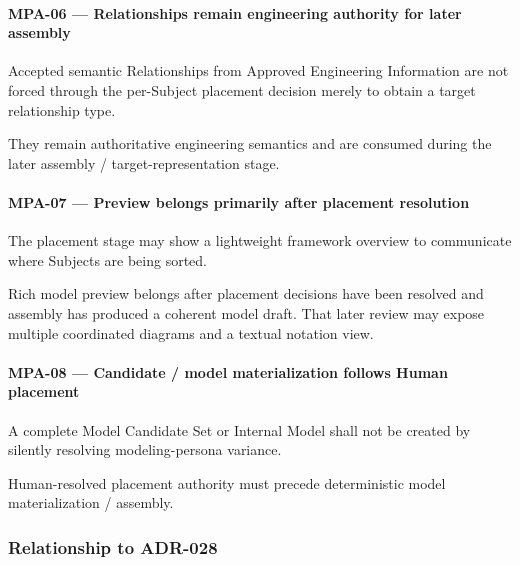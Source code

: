 \hypertarget{mpa-06--relationships-remain-engineering-authority-for-later-assembly}{%
\paragraph{MPA-06 --- Relationships remain engineering authority for later assembly}\label{mpa-06--relationships-remain-engineering-authority-for-later-assembly}}

Accepted semantic Relationships from Approved Engineering Information are not forced through the per-Subject placement decision merely to obtain a target relationship type.

They remain authoritative engineering semantics and are consumed during the later assembly / target-representation stage.

\hypertarget{mpa-07--preview-belongs-primarily-after-placement-resolution}{%
\paragraph{MPA-07 --- Preview belongs primarily after placement resolution}\label{mpa-07--preview-belongs-primarily-after-placement-resolution}}

The placement stage may show a lightweight framework overview to communicate where Subjects are being sorted.

Rich model preview belongs after placement decisions have been resolved and assembly has produced a coherent model draft. That later review may expose multiple coordinated diagrams and a textual notation view.

\hypertarget{mpa-08--candidate--model-materialization-follows-human-placement}{%
\paragraph{MPA-08 --- Candidate / model materialization follows Human placement}\label{mpa-08--candidate--model-materialization-follows-human-placement}}

A complete Model Candidate Set or Internal Model shall not be created by silently resolving modeling-persona variance.

Human-resolved placement authority must precede deterministic model materialization / assembly.

\hypertarget{relationship-to-adr-028}{%
\subsubsection{Relationship to ADR-028}\label{relationship-to-adr-028}}


